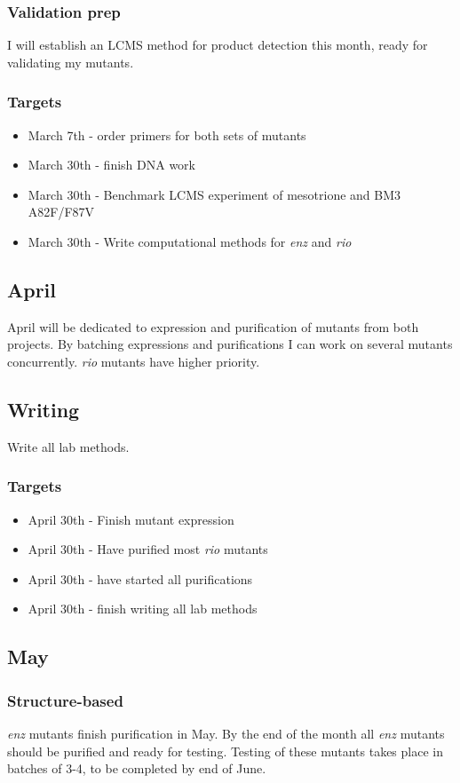 \documentclass{article}
\begin{document}
\subsubsection{Validation prep}
I will establish an LCMS method for product detection this month, ready for validating my mutants.
\subsubsection{Targets}
\begin{itemize}
\item March 7th - order primers for both sets of mutants
\item March 30th - finish DNA work
\item March 30th - Benchmark LCMS experiment of mesotrione and BM3 A82F/F87V 
\item March 30th - Write computational methods for \textit{enz} and \textit{rio}
\end{itemize}

\subsection{April}
April will be dedicated to expression and purification of mutants from both projects. By batching expressions and purifications I can work on several  mutants concurrently. \textit{rio} mutants have higher priority. 
\subsection{Writing}
Write all lab methods.
\subsubsection{Targets}
\begin{itemize}
\item April 30th - Finish mutant expression 
\item April 30th - Have purified most \textit{rio} mutants
\item April 30th - have started all purifications
\item April 30th - finish writing all lab methods
\end{itemize}

\subsection{May}
\subsubsection{Structure-based}
\textit{enz} mutants finish purification in May. By the end of the month all \textit{enz} mutants should be purified and ready for testing. %
Testing of these mutants takes place in batches of 3-4, to be completed by end of June. %
\end{document}
